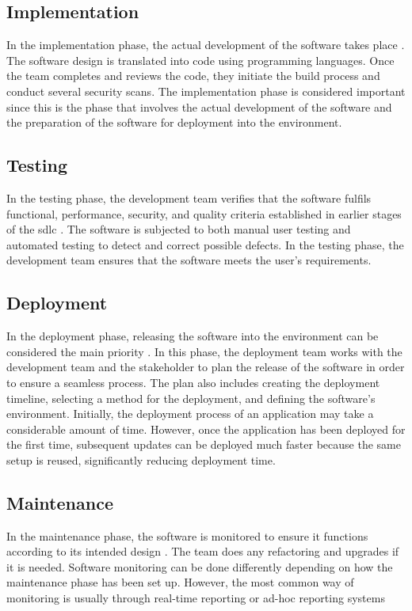 \subsection{Implementation}
In the implementation phase, the actual development of the software takes place \cite{ImplementationSDLC}. The software design is translated into code using programming languages. Once the team completes and reviews the code, they initiate the build process and conduct several security scans. The implementation phase is considered important since this is the phase that involves the actual development of the software and the preparation of the software for deployment into the environment.  
 
\subsection{Testing}
In the testing phase, the development team verifies that the software fulfils functional, performance, security, and quality criteria established in earlier stages of the \acrshort{sdlc} \cite{TestingSDLC}. The software is subjected to both manual user testing and automated testing to detect and correct possible defects. In the testing phase, the development team ensures that the software meets the user's requirements.
 
\subsection{Deployment}
In the deployment phase, releasing the software into the environment can be considered the main priority \cite{DeploymentSDLC}. In this phase, the deployment team works with the development team and the stakeholder to plan the release of the software in order to ensure a seamless process. The plan also includes creating the deployment timeline, selecting a method for the deployment, and defining the software's environment. Initially, the deployment process of an application may take a considerable amount of time. However, once the application has been deployed for the first time, subsequent updates can be deployed much faster because the same setup is reused, significantly reducing deployment time. 

\subsection{Maintenance} 
In the maintenance phase, the software is monitored to ensure it functions according to its intended design \cite{MaintenanceSDLC}. The team does any refactoring and upgrades if it is needed. Software monitoring can be done differently depending on how the maintenance phase has been set up. However, the most common way of monitoring is usually through real-time reporting or ad-hoc reporting systems


